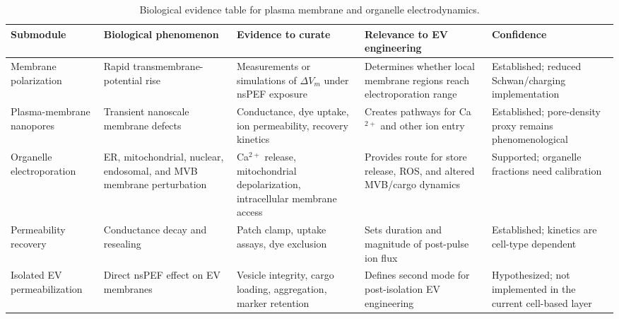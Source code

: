 \begin{table}[t]
\footnotesize\sf
\centering
\caption{Biological evidence table for plasma membrane and organelle electrodynamics.\label{T_A3_bio_electrodynamics}}
\begin{tabular}{p{2.4cm} p{3.1cm} p{3.7cm} p{2.8cm} p{4.0cm}}
\toprule
\textbf{Submodule} & \textbf{Biological phenomenon} & \textbf{Evidence to curate} & \textbf{Relevance to EV engineering} & \textbf{Confidence} \\
\midrule
Membrane polarization & Rapid transmembrane-potential rise & Measurements or simulations of $\Delta V_m$ under nsPEF exposure & Determines whether local membrane regions reach electroporation range & Established; reduced Schwan/charging implementation \cite{kotnik2000analytical,joshi2000electroporation,kotnik2019membrane,baker2024numerical} \\
Plasma-membrane nanopores & Transient nanoscale membrane defects & Conductance, dye uptake, ion permeability, recovery kinetics & Creates pathways for Ca$^{2+}$ and other ion entry & Established; pore-density proxy remains phenomenological \cite{pakhomov2007membrane,pakhomov2007long,vasilkoski2006absolute,krassowska2007modeling,kotnik2019membrane} \\
Organelle electroporation & ER, mitochondrial, nuclear, endosomal, and MVB membrane perturbation & Ca$^{2+}$ release, mitochondrial depolarization, intracellular membrane access & Provides route for store release, ROS, and altered MVB/cargo dynamics & Supported; organelle fractions need calibration \cite{vernier2003calcium,semenov2013primary,beebe2012transient,baker2024numerical} \\
Permeability recovery & Conductance decay and resealing & Patch clamp, uptake assays, dye exclusion & Sets duration and magnitude of post-pulse ion flux & Established; kinetics are cell-type dependent \cite{pakhomov2007long,nesin2012cell,pakhomov2007membrane,pakhomova2013two} \\
Isolated EV permeabilization & Direct nsPEF effect on EV membranes & Vesicle integrity, cargo loading, aggregation, marker retention & Defines second mode for post-isolation EV engineering & Hypothesized; not implemented in the current cell-based layer \cite{singh2025electroporation,hood2014maximizing,kooijmans2013electroporation,fuhrmann2015active,didiot2018optimized} \\
\bottomrule
\end{tabular}
\end{table}

